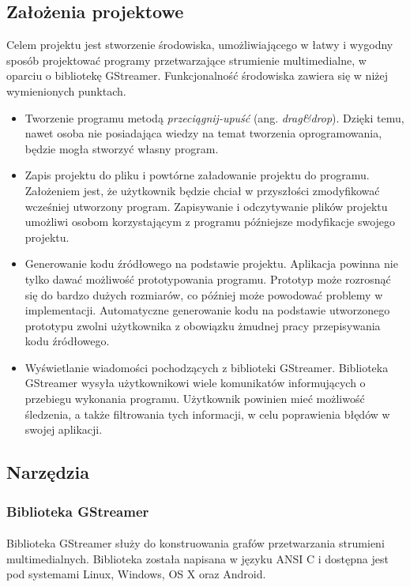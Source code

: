 \documentclass[12pt]{article}
\begin{document}
\subsection{Założenia projektowe}
Celem projektu jest stworzenie środowiska, umożliwiającego w łatwy i wygodny sposób projektować programy przetwarzające strumienie multimedialne, w oparciu o bibliotekę GStreamer. Funkcjonalność środowiska zawiera się w niżej wymienionych punktach.
\begin{itemize}
 \setlength{\itemsep}{0em}
\item Tworzenie programu metodą \textit{przeciągnij-upuść} (ang. \textit{drag\&drop}). Dzięki temu, nawet osoba nie posiadająca wiedzy na temat tworzenia oprogramowania, będzie mogła stworzyć własny program.
\item Zapis projektu do pliku i powtórne załadowanie projektu do programu. Założeniem jest, że użytkownik będzie chciał w przyszłości zmodyfikować wcześniej utworzony program. Zapisywanie i odczytywanie plików projektu umożliwi osobom korzystającym z programu późniejsze modyfikacje swojego projektu.
\item Generowanie kodu źródłowego na podstawie projektu. Aplikacja powinna nie tylko dawać możliwość prototypowania programu. Prototyp może rozrosnąć się do bardzo dużych rozmiarów, co później może powodować problemy w implementacji. Automatyczne generowanie kodu na podstawie utworzonego prototypu zwolni użytkownika z obowiązku żmudnej pracy przepisywania kodu źródłowego.
\item Wyświetlanie wiadomości pochodzących z biblioteki GStreamer. Biblioteka GStreamer wysyła użytkownikowi wiele komunikatów informujących o przebiegu wykonania programu. Użytkownik powinien mieć możliwość śledzenia, a także filtrowania tych informacji, w celu poprawienia błędów w swojej aplikacji.
\end{itemize}

\subsection{Narzędzia}
\subsubsection{Biblioteka GStreamer}
\paragraph{}
Biblioteka GStreamer służy do konstruowania grafów przetwarzania strumieni multimedialnych. Biblioteka została napisana w języku ANSI C i dostępna jest pod systemami Linux, Windows, OS X oraz Android.
\end{document}
